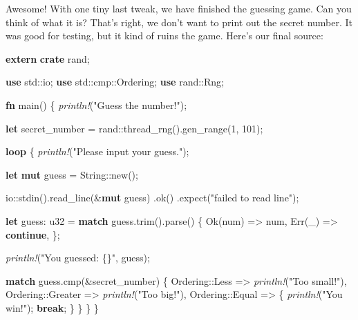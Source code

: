 \documentclass[a4paper,]{book}
\newenvironment{Shaded}{\begin{snugshade}}{\end{snugshade}}
\newcommand{\KeywordTok}[1]{\textcolor[rgb]{0.13,0.29,0.53}{\textbf{{#1}}}}
\newcommand{\DataTypeTok}[1]{\textcolor[rgb]{0.13,0.29,0.53}{{#1}}}
\newcommand{\DecValTok}[1]{\textcolor[rgb]{0.00,0.00,0.81}{{#1}}}
\newcommand{\ConstantTok}[1]{\textcolor[rgb]{0.00,0.00,0.00}{{#1}}}
\newcommand{\StringTok}[1]{\textcolor[rgb]{0.31,0.60,0.02}{{#1}}}
\newcommand{\PreprocessorTok}[1]{\textcolor[rgb]{0.56,0.35,0.01}{\textit{{#1}}}}
\newcommand{\NormalTok}[1]{{#1}}
\begin{document}
Awesome! With one tiny last tweak, we have finished the guessing game.
Can you think of what it is? That's right, we don't want to print out
the secret number. It was good for testing, but it kind of ruins the
game. Here's our final source:

\begin{Shaded}
\begin{Highlighting}[]
\KeywordTok{extern} \KeywordTok{crate} \NormalTok{rand;}

\KeywordTok{use} \NormalTok{std::io;}
\KeywordTok{use} \NormalTok{std::cmp::Ordering;}
\KeywordTok{use} \NormalTok{rand::Rng;}

\KeywordTok{fn} \NormalTok{main() \{}
    \PreprocessorTok{println!}\NormalTok{(}\StringTok{"Guess the number!"}\NormalTok{);}

    \KeywordTok{let} \NormalTok{secret_number = rand::thread_rng().gen_range(}\DecValTok{1}\NormalTok{, }\DecValTok{101}\NormalTok{);}

    \KeywordTok{loop} \NormalTok{\{}
        \PreprocessorTok{println!}\NormalTok{(}\StringTok{"Please input your guess."}\NormalTok{);}

        \KeywordTok{let} \KeywordTok{mut} \NormalTok{guess = }\DataTypeTok{String}\NormalTok{::new();}

        \NormalTok{io::stdin().read_line(&}\KeywordTok{mut} \NormalTok{guess)}
            \NormalTok{.ok()}
            \NormalTok{.expect(}\StringTok{"failed to read line"}\NormalTok{);}

        \KeywordTok{let} \NormalTok{guess: }\DataTypeTok{u32} \NormalTok{= }\KeywordTok{match} \NormalTok{guess.trim().parse() \{}
            \ConstantTok{Ok}\NormalTok{(num) => num,}
            \ConstantTok{Err}\NormalTok{(_) => }\KeywordTok{continue}\NormalTok{,}
        \NormalTok{\};}

        \PreprocessorTok{println!}\NormalTok{(}\StringTok{"You guessed: \{\}"}\NormalTok{, guess);}

        \KeywordTok{match} \NormalTok{guess.cmp(&secret_number) \{}
            \NormalTok{Ordering::Less    => }\PreprocessorTok{println!}\NormalTok{(}\StringTok{"Too small!"}\NormalTok{),}
            \NormalTok{Ordering::Greater => }\PreprocessorTok{println!}\NormalTok{(}\StringTok{"Too big!"}\NormalTok{),}
            \NormalTok{Ordering::Equal   => \{}
                \PreprocessorTok{println!}\NormalTok{(}\StringTok{"You win!"}\NormalTok{);}
                \KeywordTok{break}\NormalTok{;}
            \NormalTok{\}}
        \NormalTok{\}}
    \NormalTok{\}}
\NormalTok{\}}
\end{Highlighting}
\end{Shaded}
\end{document}
